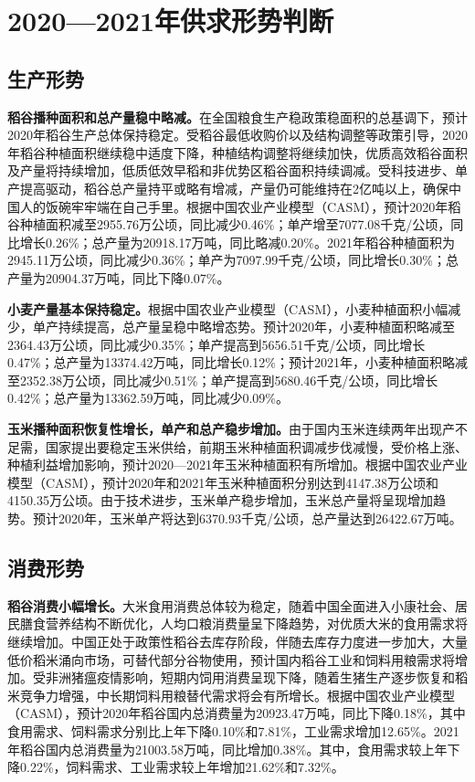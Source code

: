 \documentclass{progbookcn}
\begin{document}
\section{2020—2021年供求形势判断}
\subsection{生产形势}

\textbf{稻谷播种面积和总产量稳中略减。}在全国粮食生产稳政策稳面积的总基调下，预计2020年稻谷生产总体保持稳定。受稻谷最低收购价以及结构调整等政策引导，2020年稻谷种植面积继续稳中适度下降，种植结构调整将继续加快，优质高效稻谷面积及产量将持续增加，低质低效早稻和非优势区稻谷面积持续调减。受科技进步、单产提高驱动，稻谷总产量持平或略有增减，产量仍可能维持在2亿吨以上，确保中国人的饭碗牢牢端在自己手里。根据中国农业产业模型（CASM），预计2020年稻谷种植面积减至2955.76万公顷，同比减少0.46\%；单产增至7077.08千克/公顷，同比增长0.26\%；总产量为20918.17万吨，同比略减0.20\%。2021年稻谷种植面积为2945.11万公顷，同比减少0.36\%；单产为7097.99千克/公顷，同比增长0.30\%；总产量为20904.37万吨，同比下降0.07\%。

\textbf{小麦产量基本保持稳定。}根据中国农业产业模型（CASM），小麦种植面积小幅减少，单产持续提高，总产量呈稳中略增态势。预计2020年，小麦种植面积略减至2364.43万公顷，同比减少0.35\%；单产提高到5656.51千克/公顷，同比增长0.47\%；总产量为13374.42万吨，同比增长0.12\%；预计2021年，小麦种植面积略减至2352.38万公顷，同比减少0.51\%；单产提高到5680.46千克/公顷，同比增长0.42\%；总产量为13362.59万吨，同比减少0.09\%。

\textbf{玉米播种面积恢复性增长，单产和总产稳步增加。}由于国内玉米连续两年出现产不足需，国家提出要稳定玉米供给，前期玉米种植面积调减步伐减慢，受价格上涨、种植利益增加影响，预计2020—2021年玉米种植面积有所增加。根据中国农业产业模型（CASM），预计2020年和2021年玉米种植面积分别达到4147.38万公顷和4150.35万公顷。由于技术进步，玉米单产稳步增加，玉米总产量将呈现增加趋势。预计2020年，玉米单产将达到6370.93千克/公顷，总产量达到26422.67万吨。

\subsection{消费形势}
\textbf{稻谷消费小幅增长。}大米食用消费总体较为稳定，随着中国全面进入小康社会、居民膳食营养结构不断优化，人均口粮消费量呈下降趋势，对优质大米的食用需求将继续增加。中国正处于政策性稻谷去库存阶段，伴随去库存力度进一步加大，大量低价稻米涌向市场，可替代部分谷物使用，预计国内稻谷工业和饲料用粮需求将增加。受非洲猪瘟疫情影响，短期内饲用消费呈现下降，随着生猪生产逐步恢复和稻米竞争力增强，中长期饲料用粮替代需求将会有所增长。根据中国农业产业模型（CASM），预计2020年稻谷国内总消费量为20923.47万吨，同比下降0.18\%，其中食用需求、饲料需求分别比上年下降0.10\%和7.81\%，工业需求增加12.65\%。2021年稻谷国内总消费量为21003.58万吨，同比增加0.38\%。其中，食用需求较上年下降0.22\%，饲料需求、工业需求较上年增加21.62\%和7.32\%。
\end{document}
